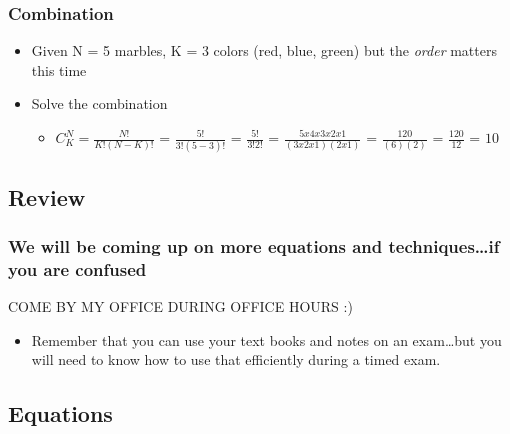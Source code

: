 \documentclass[]{article}
\begin{document}
\subsubsection{Combination}\label{combination}

\begin{itemize}
\itemsep1pt\parskip0pt
\item
  Given N = 5 marbles, K = 3 colors (red, blue, green) but the
  \emph{order} matters this time
\item
  Solve the combination

  \begin{itemize}
  \itemsep1pt\parskip0pt
  \item
    $C_K^N = \frac{N!}{K!(N-K)!}$ = $\frac{5!}{3!(5-3)!}$ =
    $\frac{5!}{3!2!}$ = $\frac{5 x 4 x 3 x 2 x 1}{(3 x 2 x 1)(2 x 1)}$ =
    $\frac{120}{(6)(2)}$ = $\frac{120}{12}$ = $10$
  \end{itemize}
\end{itemize}

\subsection{Review}\label{review}

\subsubsection{We will be coming up on more equations and
techniques\ldots{}if you are
confused}\label{we-will-be-coming-up-on-more-equations-and-techniquesif-you-are-confused}

COME BY MY OFFICE DURING OFFICE HOURS :)

\begin{itemize}
\itemsep1pt\parskip0pt
\item
  Remember that you can use your text books and notes on an
  exam\ldots{}but you will need to know how to use that efficiently
  during a timed exam.
\end{itemize}

\subsection{Equations}\label{equations}
\end{document}
